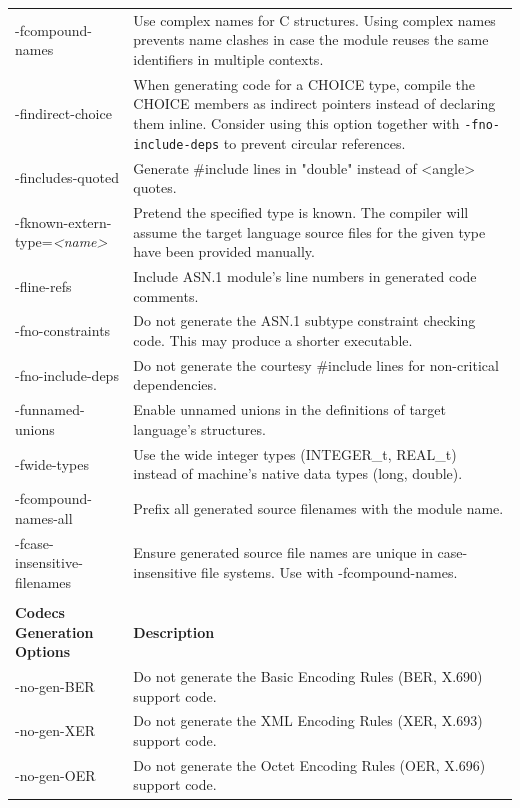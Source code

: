 \documentclass[english,oneside,12pt]{book}
\begin{document}
\begin{longtable}{lp{4in}}
{\ttfamily -fcompound-names} & {\small Use complex names for C structures. Using complex names prevents
name clashes in case the module reuses the same identifiers in multiple
contexts.}\\
{\ttfamily -findirect-choice} & {\small When generating code for a CHOICE type, compile the CHOICE
members as indirect pointers instead of declaring them inline. Consider
using this option together with \texttt{-fno-include-deps}
to prevent circular references.}\\
{\ttfamily -fincludes-quoted} & {\small Generate \#include lines in "double" instead of <angle> quotes.}\\
{\ttfamily -fknown-extern-type=\emph{<name>}} & {\small Pretend the specified type is known. The compiler will assume
the target language source files for the given type have been provided
manually. }\\
{\ttfamily -fline-refs} & {\small Include ASN.1 module's line numbers in generated code comments.}\\
{\ttfamily -fno-constraints} & {\small Do not generate the ASN.1 subtype constraint checking code. This
may produce a shorter executable.}\\
{\ttfamily -fno-include-deps} & {\small Do not generate the courtesy \#include lines for non-critical dependencies.}\\
{\ttfamily -funnamed-unions} & {\small Enable  unnamed  unions in the definitions of target language's structures.}\\
{\ttfamily -fwide-types} & {\small Use the wide integer types (INTEGER\_t, REAL\_t) instead of machine's native data types (long, double). }\\
{\ttfamily -fcompound-names-all} & {\small Prefix all generated source filenames with the module name.}\\
{\ttfamily -fcase-insensitive-filenames} & {\small Ensure generated source file names are unique in case-insensitive file systems. Use with -fcompound-names.}\\\\
\textbf{Codecs Generation Options} & \textbf{Description}\\
\midrule
{\ttfamily -no-gen-BER} & {\small Do not generate the Basic Encoding Rules (BER, X.690) support code.}\\
{\ttfamily -no-gen-XER} & {\small Do not generate the XML Encoding Rules (XER, X.693) support code.}\\
{\ttfamily -no-gen-OER} & {\small Do not generate the Octet Encoding Rules (OER, X.696) support code.}\\

\end{longtable}
\end{document}

